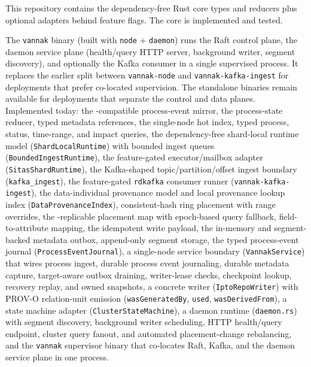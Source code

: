 This repository contains the dependency-free Rust core types and reducers plus
optional adapters behind feature flags. The core is implemented and tested.

The \texttt{vannak} binary (built with \texttt{node} + \texttt{daemon}) runs
the Raft control plane, the daemon service plane (health/query HTTP server,
background writer, segment discovery), and optionally the Kafka consumer in a
single supervised process. It replaces the earlier split between
\texttt{vannak-node} and \texttt{vannak-kafka-ingest} for deployments that
prefer co-located supervision. The standalone binaries remain available for
deployments that separate the control and data planes. \\

Implemented today: the \durga{}-compatible process-event mirror, the
process-state reducer, typed metadata references, the single-node hot index,
typed process, status, time-range, and impact queries, the dependency-free
shard-local runtime model (\texttt{ShardLocalRuntime}) with bounded ingest
queues (\texttt{BoundedIngestRuntime}), the feature-gated \sitas{}
executor/mailbox adapter (\texttt{SitasShardRuntime}), the Kafka-shaped
topic/partition/offset ingest boundary (\texttt{kafka\_ingest}), the
feature-gated \texttt{rdkafka} consumer runner (\texttt{vannak-kafka-ingest}),
the
data-individual provenance model and local provenance lookup index
(\texttt{DataProvenanceIndex}), consistent-hash ring placement with range
overrides, the \raft{}-replicable placement map with epoch-based query fallback,
field-to-attribute mapping, the idempotent write payload, the in-memory and
segment-backed metadata outbox, append-only segment storage, the typed
process-event journal (\texttt{ProcessEventJournal}), a single-node service
boundary (\texttt{VannakService}) that wires process ingest, durable process
event journaling, durable metadata capture, target-aware outbox draining,
writer-lease checks, checkpoint lookup, recovery replay, and owned snapshots, a
concrete \ipto{} writer
(\texttt{IptoRepoWriter}) with PROV-O relation-unit emission
(\texttt{wasGeneratedBy}, \texttt{used}, \texttt{wasDerivedFrom}), a
\graft{} state machine adapter (\texttt{ClusterStateMachine}), a daemon
runtime (\texttt{daemon.rs}) with segment discovery, background writer
scheduling, HTTP health/query endpoint, cluster query fanout, and automated
placement-change rebalancing, and the \texttt{vannak} supervisor binary that
co-locates Raft, Kafka, and the daemon service plane in one process.

